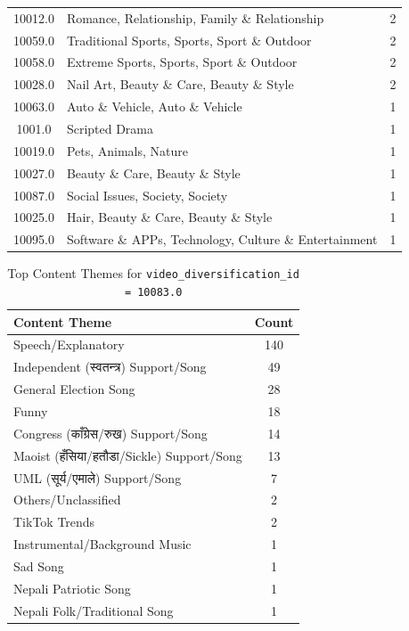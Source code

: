 \documentclass[12pt,a4paper]{report}
\begin{document}
\begin{table}[h]
\begin{tabular}{|c|p{8cm}|c|}
10012.0 & Romance, Relationship, Family \& Relationship & 2 \\
10059.0 & Traditional Sports, Sports, Sport \& Outdoor & 2 \\
10058.0 & Extreme Sports, Sports, Sport \& Outdoor & 2 \\
10028.0 & Nail Art, Beauty \& Care, Beauty \& Style & 2 \\
10063.0 & Auto \& Vehicle, Auto \& Vehicle & 1 \\
1001.0 & Scripted Drama & 1 \\
10019.0 & Pets, Animals, Nature & 1 \\
10027.0 & Beauty \& Care, Beauty \& Style & 1 \\
10087.0 & Social Issues, Society, Society & 1 \\
10025.0 & Hair, Beauty \& Care, Beauty \& Style & 1 \\
10095.0 & Software \& APPs, Technology, Culture \& Entertainment & 1 \\
\hline
\end{tabular}
\end{table}
\clearpage %
\begin{table}[h]
    \centering
    \caption{Top Content Themes for \texttt{video\_diversification\_id = 10083.0}}
    \label{tab:content_themes_10083}
    \begin{tabular}{l c}
        \toprule
        \textbf{Content Theme} & \textbf{Count} \\
        \midrule
        Speech/Explanatory & 140 \\
        Independent (\texthindi{स्वतन्त्र}) Support/Song & 49 \\
        General Election Song & 28 \\
        Funny & 18 \\
        Congress (\texthindi{काँग्रेस/रुख}) Support/Song & 14 \\
        Maoist (\texthindi{हँसिया/हतौडा}/Sickle) Support/Song & 13 \\
        UML (\texthindi{सूर्य/एमाले}) Support/Song & 7 \\
        Others/Unclassified & 2 \\
        TikTok Trends & 2 \\
        Instrumental/Background Music & 1 \\
        Sad Song & 1 \\
        Nepali Patriotic Song & 1 \\
        Nepali Folk/Traditional Song & 1 \\
        \bottomrule
    \end{tabular}
\end{table}
\end{document}
